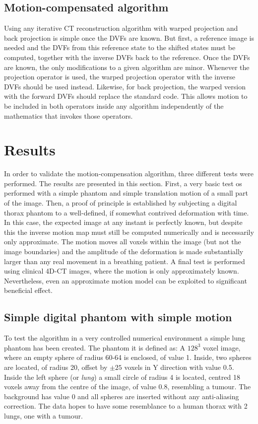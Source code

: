 \subsection{Motion-compensated algorithm}

Using any iterative CT reconstruction algorithm with warped projection and back projection is simple once the DVFs are known.  But first, a reference image is needed and the DVFs from this reference state to the shifted states must be computed, together with the inverse DVFs back to the reference. Once the DVFs are known, the only modifications to a given algorithm are minor.  Whenever the projection operator is used, the warped projection operator with the inverse DVFs should be used instead.  Likewise, for back projection, the warped version with the forward DVFs should replace the standard code.  This allows motion to be included in both operators inside any algorithm independently of the mathematics that invokes those operators.





\section{Results}

In order to validate the motion-compensation algorithm, three different tests were performed.  The results are presented in this section. First, a very basic test os performed with a simple phantom and simple translation motion of a small part of the image. Then, a proof of principle is established by subjecting a digital thorax phantom to a well-defined, if somewhat contrived deformation with time.  In this case, the expected image at any instant is perfectly known, but despite this the inverse motion map must still be computed numerically and is necessarily only approximate.  The motion moves all voxels within the image (but not the image boundaries) and the amplitude of the deformation is made substantially larger than any real movement in a breathing patient.  A final test is performed using clinical 4D-CT images, where the motion is only approximately known.  Nevertheless, even an approximate motion model can be exploited to significant beneficial effect.


\subsection{Simple digital phantom with simple motion}
To test the algorithm in a very controlled numerical environment a simple lung phantom has been created. The phantom it is defined as: A $128^3$ voxel image, where an empty sphere of radius 60-64 is enclosed, of value 1. Inside, two spheres are located, of radius 20, offset by $\pm 25$ voxels in Y direction with value 0.5. Inside the left sphere (or \textit{lung}) a small circle of radius 4 is located, centred 18 voxels away from the centre of the image, of value 0.8, resembling a tumour. The background has value 0 and all spheres are inserted without any anti-aliasing correction. The data hopes to have some resemblance to a human thorax with 2 lungs, one with a tumour.

